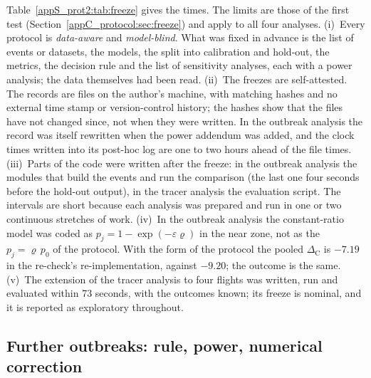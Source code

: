 Table~\ref{appS_prot2:tab:freeze} gives the times. The limits are those of the first test
(Section~\ref{appC_protocol:sec:freeze}) and apply to all four analyses.
(i)~Every protocol is \emph{data-aware} and \emph{model-blind}. What was fixed in advance is the list of
events or datasets, the models, the split into calibration and hold-out, the metrics, the decision rule and
the list of sensitivity analyses, each with a power analysis; the data themselves had been read.
(ii)~The freezes are self-attested. The records are files on the author's machine, with matching hashes and
no external time stamp or version-control history; the hashes show that the files have not changed since, not
when they were written. In the outbreak analysis the record was itself rewritten when the power addendum was
added, and the clock times written into its post-hoc log are one to two hours ahead of the file times.
(iii)~Parts of the code were written after the freeze: in the outbreak analysis the modules that build the
events and run the comparison (the last one four seconds before the hold-out output), in the tracer analysis
the evaluation script. The intervals are short because each analysis was prepared and run in one or two continuous stretches of
work.
(iv)~In the outbreak analysis the constant-ratio model was coded as $p_j=1-\exp(-\varepsilon\varrho)$ in the near
zone, not as the $p_j=\varrho\,p_0$ of the protocol. With the form of the protocol the pooled
$\Delta_{\mathrm{C}}$ is $-7.19$ in the re-check's re-implementation, against $-9.20$; the outcome is the
same.
(v)~The extension of the tracer analysis to four flights was written, run and evaluated within 73 seconds,
with the outcomes known; its freeze is nominal, and it is reported as exploratory throughout.

\subsection{Further outbreaks: rule, power, numerical correction}\label{appS_prot2:sec:outbreaks}

